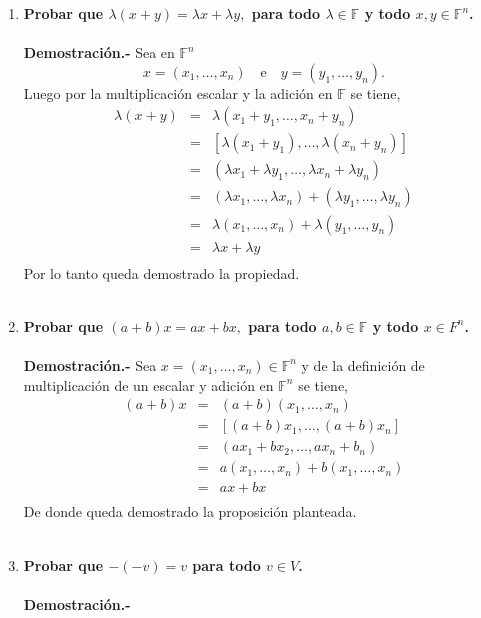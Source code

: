 \begin{multicols}{2}
\begin{enumerate}
     \item \textbf{\boldmath Probar que $\lambda(x+y)=\lambda x + \lambda y,$ para todo $\lambda \in \mathbb{F}$ y todo $x,y\in \mathbb{F}^n$.}\\\\
	 \textbf{Demostración.-}\; Sea en $\mathbb{F}^n$ $$x=(x_1,\ldots,x_n)\quad \mbox{e}\quad y=(y_1,\ldots,y_n).$$ 
	 Luego por la multiplicación escalar y la adición en $\mathbb{F}$ se tiene,  
    	 $$\begin{array}{rcl}
	     \lambda(x+y)&=&\lambda(x_1+y_1,\ldots,x_n+y_n)\\
			 &=&[\lambda(x_1+y_1),\ldots,\lambda(x_n+y_n)]\\
			 &=&(\lambda x_1 + \lambda y_1,\ldots,\lambda x_n + \lambda y_n)\\
			 &=&(\lambda x_1,\ldots,\lambda x_n)+(\lambda y_1,\ldots,\lambda y_n)\\
			 &=&\lambda(x_1,\ldots,x_n)+\lambda(y_1,\ldots,y_n)\\
			 &=&\lambda x + \lambda y\\
	 \end{array}$$
	Por lo tanto queda demostrado la propiedad.\\\\

    \item \textbf{\boldmath Probar que $(a+b)x=ax+bx,$ para todo $a,b\in \mathbb{F}$ y todo $x\in F^n$.}\\\\
	\textbf{Demostración.-}\; Sea $x=(x_1,\ldots,x_n)\in \mathbb{F}^n$ y de la definición de multiplicación de un escalar y adición en $\mathbb{F}^n$ se tiene,
	$$\begin{array}{rcl}
	     (a+b)x&=&(a+b)(x_1,\ldots,x_n)\\
		   &=&[(a+b)x_1,\ldots,(a+b)x_n]\\
		   &=&(ax_1+bx_2,\ldots,a x_n + b_n)\\
		   &=&a(x_1,\ldots, x_n)+b( x_1,\ldots, x_n)\\
		   &=&ax + bx\\
       \end{array}$$
       De donde queda demostrado la proposición planteada.\\\\ 

   \item \textbf{\boldmath Probar que $-(-v)=v$ para todo $v\in V$.}\\\\
       	\textbf{Demostración.-}\;


\end{enumerate}


\end{multicols}

